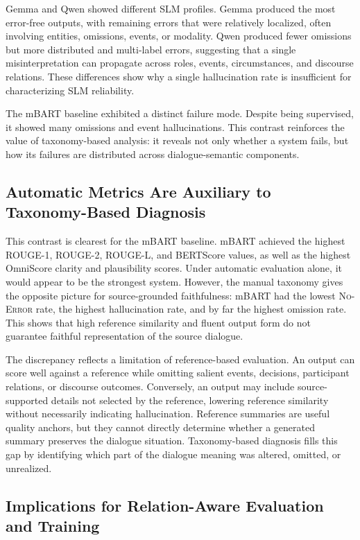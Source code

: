 \documentclass[11pt]{article}
\begin{document}
Gemma and Qwen showed different SLM profiles. Gemma produced the most error-free outputs, with remaining errors that were relatively localized, often involving entities, omissions, events, or modality. Qwen produced fewer omissions but more distributed and multi-label errors, suggesting that a single misinterpretation can propagate across roles, events, circumstances, and discourse relations. These differences show why a single hallucination rate is insufficient for characterizing SLM reliability.

The mBART baseline exhibited a distinct failure mode. Despite being supervised, it showed many omissions and event hallucinations. This contrast reinforces the value of taxonomy-based analysis: it reveals not only whether a system fails, but how its failures are distributed across dialogue-semantic components.



\subsection{Automatic Metrics Are Auxiliary to Taxonomy-Based Diagnosis}

This contrast is clearest for the mBART baseline. mBART achieved the highest ROUGE-1, ROUGE-2, ROUGE-L, and BERTScore values, as well as the highest OmniScore clarity and plausibility scores. Under automatic evaluation alone, it would appear to be the strongest system. However, the manual taxonomy gives the opposite picture for source-grounded faithfulness: mBART had the lowest \textsc{No-Error} rate, the highest hallucination rate, and by far the highest omission rate. This shows that high reference similarity and fluent output form do not guarantee faithful representation of the source dialogue.

The discrepancy reflects a limitation of reference-based evaluation. An output can score well against a reference while omitting salient events, decisions, participant relations, or discourse outcomes. Conversely, an output may include source-supported details not selected by the reference, lowering reference similarity without necessarily indicating hallucination. Reference summaries are useful quality anchors, but they cannot directly determine whether a generated summary preserves the dialogue situation. Taxonomy-based diagnosis fills this gap by identifying which part of the dialogue meaning was altered, omitted, or unrealized.

\subsection{Implications for Relation-Aware Evaluation and Training}
\end{document}
